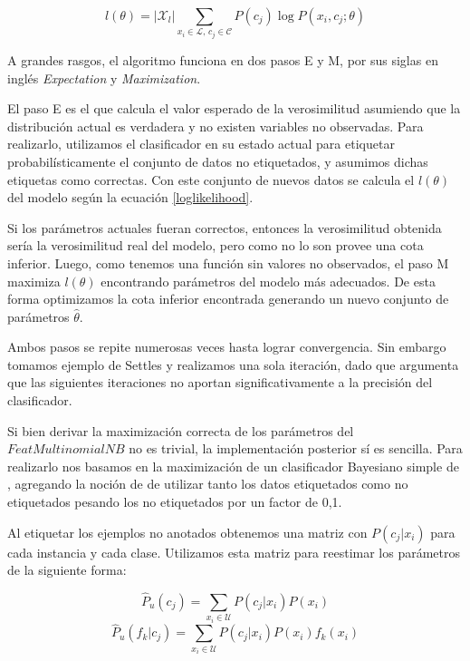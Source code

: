 \begin{equation}\label{loglikelihood}
l(\theta) = |\mathcal{X}_l| \sum_{x_i \in \mathcal{L}, \, c_j \in \mathcal{C}} P(c_j) \log P(x_i, c_j; \theta)
\end{equation}

A grandes rasgos, el algoritmo funciona en dos pasos E y M, por sus siglas en inglés \textit{Expectation} y \textit{Maximization}.

El paso E es el que calcula el valor esperado de la verosimilitud asumiendo que la distribución actual es verdadera y no existen variables no observadas. Para realizarlo, utilizamos el clasificador en su estado actual para etiquetar probabilísticamente el conjunto de datos no etiquetados, y asumimos dichas etiquetas como correctas. Con este conjunto de nuevos datos se calcula el $l(\theta)$ del modelo según la ecuación \ref{loglikelihood}.

Si los parámetros actuales fueran correctos, entonces la verosimilitud obtenida sería la verosimilitud real del modelo, pero como no lo son provee una cota inferior. Luego, como tenemos una función sin valores no observados, el paso M maximiza $l(\theta)$ encontrando parámetros del modelo más adecuados. De esta forma optimizamos la cota inferior encontrada generando un nuevo conjunto de parámetros $\hat{\theta}$.

Ambos pasos se repite numerosas veces hasta lograr convergencia. Sin embargo tomamos ejemplo de Settles y realizamos una sola iteración, dado que argumenta que las siguientes iteraciones no aportan significativamente a la precisión del clasificador.

Si bien derivar la maximización correcta de los parámetros del $FeatMultinomialNB$ no es trivial, la implementación posterior sí es sencilla. Para realizarlo nos basamos en la maximización de un clasificador Bayesiano simple de \citet{data-mining-Liu}, agregando la noción de \citet{dualist} de utilizar tanto los datos etiquetados como no etiquetados pesando los no etiquetados por un factor de 0,1.

Al etiquetar los ejemplos no anotados obtenemos una matriz con $P(c_j|x_i)$ para cada instancia y cada clase. Utilizamos esta matriz para reestimar los parámetros de la siguiente forma:

\begin{equation*}
\hat{P}_u(c_j) = \sum_{x_i \in \mathcal{U}} P(c_j|x_i) P(x_i)
\end{equation*}
\begin{equation*}
\hat{P}_u(f_k|c_j) = \sum_{x_i \in \mathcal{U}} P(c_j|x_i) P(x_i) f_k(x_i)
\end{equation*}

